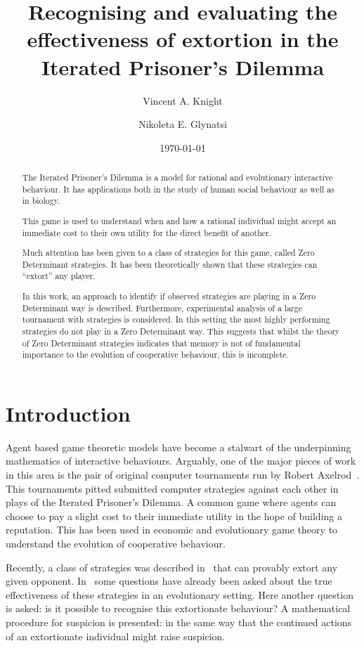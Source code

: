 \documentclass[a4paper]{article}
\title{Recognising and evaluating the effectiveness
       of extortion in the Iterated Prisoner's Dilemma}
\author{Vincent A. Knight \and Nikoleta E. Glynatsi}
\date{\today}
\begin{document}
\maketitle

\begin{abstract}
    The Iterated Prisoner's Dilemma is a model for rational and evolutionary
    interactive behaviour. It has applications both in the study of human social
    behaviour as well as in biology.

    This game is used to understand when and how a rational individual might
    accept an immediate cost to their own utility for the direct benefit of
    another.

    Much attention has been given to a class of strategies for this game, called
    Zero Determinant strategies. It has been theoretically shown that these
    strategies can ``extort'' any player.

    In this work, an approach to identify if observed strategies are playing in
    a Zero Determinant way is described. Furthermore, experimental analysis of
    a large tournament with 
    strategies is considered. In this setting
    the most highly performing strategies do not play in a Zero Determinant way.
    This suggests that whilst the theory of Zero Determinant strategies
    indicates that memory is not of fundamental importance to the evolution of
    cooperative behaviour, this is incomplete.
\end{abstract}

\section{Introduction}\label{sec:introduction}

Agent based game theoretic models have become a stalwart of the underpinning
mathematics of interactive behaviours. Arguably, one of the major pieces of work
in this area is the pair of original computer tournaments run by Robert
Axelrod~\cite{Axelrod1980, Axelrod1980a}. This tournaments pitted submitted
computer strategies against each other in plays of the Iterated Prisoner's
Dilemma. A common game where agents can choose to pay a slight cost to their
immediate utility in the hope of building a reputation. This has been used in
economic and evolutionary game theory to understand the evolution of cooperative
behaviour.

Recently, a class of strategies was described in~\cite{Press2012} that can
provably extort any given opponent. In~\cite{Hilbe2013, Moran1707} some
questions have already been asked about the true effectiveness of these
strategies in an evolutionary setting. Here another question is asked: is it
possible to recognise this extortionate behaviour? A mathematical procedure for
suspicion is presented: in the same way that the continued actions of an
extortionate individual might raise suspicion.
\end{document}
